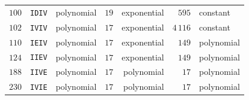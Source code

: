 \begin{tabular}{rlrrrrl}
\quad $100$ & \texttt{IDIV} & polynomial & $19$ & exponential & $595$ & constant \\
\quad $102$ & \texttt{IVIV} & polynomial & $17$ & exponential & $4\,116$ & constant \\
\quad $110$ & \texttt{IEIV} & polynomial & $17$ & exponential & $149$ & polynomial \\
\quad $124$ & \texttt{IIEV} & polynomial & $17$ & exponential & $149$ & polynomial \\
\quad $188$ & \texttt{IIVE} & polynomial & $17$ & polynomial & $17$ & polynomial \\
\quad $230$ & \texttt{IVIE} & polynomial & $17$ & polynomial & $17$ & polynomial \\
\hline
\end{tabular}
